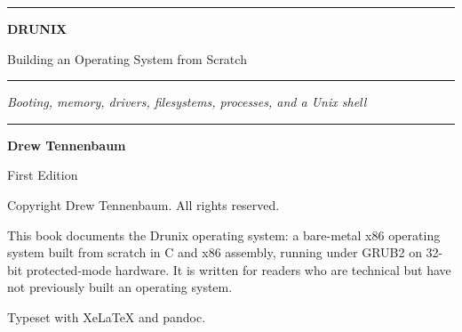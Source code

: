\begin{titlepage}
\centering

\vspace*{3cm}
{\color{black}\rule{\linewidth}{1pt}}
\vspace{1cm}

{\fontsize{72}{80}\selectfont\textbf{DRUNIX}}

\vspace{0.5cm}

{\LARGE Building an Operating System from Scratch}

\vspace{0.8cm}
{\color{black}\rule{\linewidth}{0.4pt}}

\vspace{0.8cm}
{\normalsize\textit{Booting, memory, drivers, filesystems, processes, and a Unix shell}}

\vfill

{\color{black}\rule{\linewidth}{0.4pt}}
\vspace{0.5cm}

{\Large\textbf{Drew Tennenbaum}}

\vspace{0.3cm}

{\normalsize First Edition \quad\textbullet\quad \the\year{}}

\vspace{1.5cm}

\end{titlepage}

\newpage
\thispagestyle{empty}
\vspace*{\fill}
{\small
\noindent Copyright \textcopyright{} \the\year{} Drew Tennenbaum. All rights reserved.

\vspace{1em}
\noindent This book documents the Drunix operating system: a bare-metal x86 operating
system built from scratch in C and x86 assembly, running under GRUB2 on 32-bit
protected-mode hardware. It is written for readers who are technical but have not
previously built an operating system.

\vspace{1em}
\noindent Typeset with XeLaTeX and pandoc.
}
\vspace*{\fill}
\newpage
